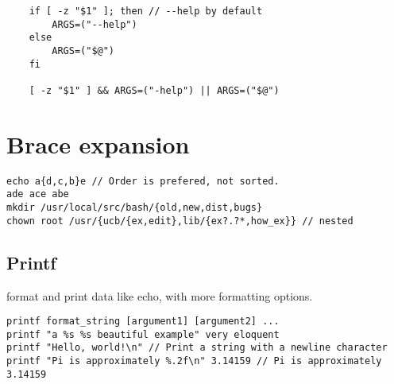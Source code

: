 \begin{verbatim}
    if [ -z "$1" ]; then // --help by default
        ARGS=("--help")
    else
        ARGS=("$@")
    fi

    [ -z "$1" ] && ARGS=("-help") || ARGS=("$@")
\end{verbatim}

\section{Brace expansion}

\begin{verbatim}
echo a{d,c,b}e // Order is prefered, not sorted.
ade ace abe
mkdir /usr/local/src/bash/{old,new,dist,bugs}
chown root /usr/{ucb/{ex,edit},lib/{ex?.?*,how_ex}} // nested
\end{verbatim}

\subsection{Printf}

format and print data like echo, with more formatting options.

\begin{verbatim}
printf format_string [argument1] [argument2] ...
printf "a %s %s beautiful example" very eloquent
printf "Hello, world!\n" // Print a string with a newline character
printf "Pi is approximately %.2f\n" 3.14159 // Pi is approximately 3.14159
\end{verbatim}
